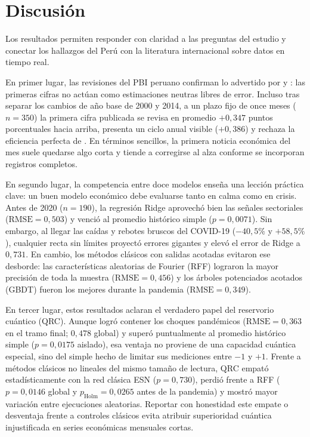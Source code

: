 \section{Discusión}

Los resultados permiten responder con claridad a las preguntas del estudio y conectar los hallazgos del Perú con la literatura internacional sobre datos en tiempo real.

En primer lugar, las revisiones del PBI peruano confirman lo advertido por \textcite{croushore2011} y \textcite{mankiw1986}: las primeras cifras no actúan como estimaciones neutras libres de error. Incluso tras separar los cambios de año base de 2000 y 2014, a un plazo fijo de once meses (\(n=350\)) la primera cifra publicada se revisa en promedio \(+0{,}347\) puntos porcentuales hacia arriba, presenta un ciclo anual visible (\(+0{,}386\)) y rechaza la eficiencia perfecta de \textcite{mincer1969}. En términos sencillos, la primera noticia económica del mes suele quedarse algo corta y tiende a corregirse al alza conforme se incorporan registros completos.

En segundo lugar, la competencia entre doce modelos enseña una lección práctica clave: un buen modelo económico debe evaluarse tanto en calma como en crisis. Antes de 2020 (\(n=190\)), la regresión Ridge aprovechó bien las señales sectoriales (\(\text{RMSE}=0{,}503\)) y venció al promedio histórico simple (\(p=0{,}0071\)). Sin embargo, al llegar las caídas y rebotes bruscos del COVID-19 (\(-40{,}5\%\) y \(+58{,}5\%\)), cualquier recta sin límites proyectó errores gigantes y elevó el error de Ridge a \(0{,}731\). En cambio, los métodos clásicos con salidas acotadas evitaron ese desborde: las características aleatorias de Fourier (RFF) lograron la mayor precisión de toda la muestra (\(\text{RMSE}=0{,}456\)) y los árboles potenciados acotados (GBDT) fueron los mejores durante la pandemia (\(\text{RMSE}=0{,}349\)).

En tercer lugar, estos resultados aclaran el verdadero papel del reservorio cuántico (QRC). Aunque logró contener los choques pandémicos (\(\text{RMSE}=0{,}363\) en el tramo final; \(0{,}478\) global) y superó puntualmente al promedio histórico simple (\(p=0{,}0175\) aislado), esa ventaja no proviene de una capacidad cuántica especial, sino del simple hecho de limitar sus mediciones entre \(-1\) y \(+1\). Frente a métodos clásicos no lineales del mismo tamaño de lectura, QRC empató estadísticamente con la red clásica ESN (\(p=0{,}730\)), perdió frente a RFF (\(p=0{,}0146\) global y \(p_{\text{Holm}}=0{,}0265\) antes de la pandemia) y mostró mayor variación entre ejecuciones aleatorias. Reportar con honestidad este empate o desventaja frente a controles clásicos evita atribuir superioridad cuántica injustificada en series económicas mensuales cortas.

